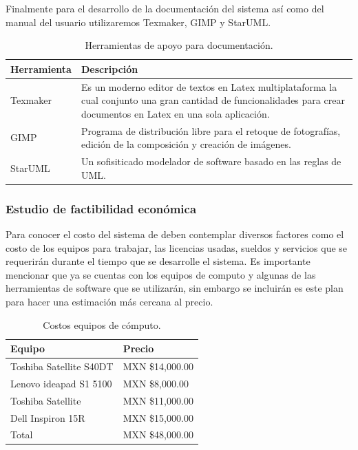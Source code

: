 \documentclass[12pt]{report}
\begin{document}
Finalmente para el desarrollo de la documentación del sistema así como del manual del usuario utilizaremos Texmaker, GIMP y StarUML.
\begin{table}[H]
\begin{center}
\begin{tabular}{|p{40mm}|p{100mm}|}
\hline
 Herramienta & Descripción\\
\hline \hline 
Texmaker & Es un moderno editor de textos en Latex multiplataforma la cual conjunto una gran cantidad de funcionalidades para crear documentos en Latex en una sola aplicación.\cite{texm}\\
\hline
GIMP &  Programa de distribución libre para el retoque de fotografías, edición de la composición y creación de imágenes.\cite{gimp}\\
\hline
StarUML & Un sofisiticado modelador de software basado en las reglas de UML.\cite{star} \\
\hline
\end{tabular}
\caption{Herramientas de apoyo para documentación.}
\end{center}
\end{table}

\subsubsection{Estudio de factibilidad económica}
Para conocer el costo del sistema de deben contemplar diversos factores como el costo de los equipos para trabajar, las licencias usadas, sueldos y servicios que se requerirán durante el tiempo que se desarrolle el sistema. Es importante mencionar que 
ya se cuentas con los equipos de computo y algunas de las herramientas de software que se utilizarán, sin embargo se incluirán es este plan para hacer una estimación más cercana al precio.\\
\begin{table}[H]
\begin{center}
\begin{tabular}{p{60mm}p{40mm}}
\hline
Equipo & Precio \\
\hline \hline 
Toshiba Satellite S40DT & MXN \$14,000.00\\
Lenovo ideapad S1 5100 & MXN \$8,000.00\\
Toshiba Satellite & MXN \$11,000.00 \\
Dell Inspiron 15R & MXN \$15,000.00\\
\hline \hline
Total & MXN \$48,000.00\\
\hline
\end{tabular}
\caption{Costos equipos de cómputo.}
\end{center}
\end{table}
\end{document}
